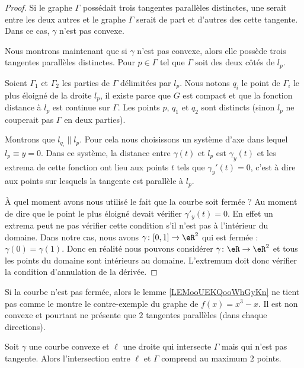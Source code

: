 \begin{proof}
    Si le graphe \( \Gamma\) possédait trois tangentes parallèles distinctes, une serait entre les deux autres et le graphe \( \Gamma\) serait de part et d'autres des cette tangente. Dans ce cas, \( \gamma\) n'est pas convexe.

    Nous montrons maintenant que si \( \gamma\) n'est pas convexe, alors elle possède trois tangentes parallèles distinctes. Pour \( p\in \Gamma\) tel que \( \Gamma\) soit des deux côtés de \( l_p\).

    Soient \( \Gamma_1\) et \( \Gamma_2\) les parties de \( \Gamma\) délimitées par \( l_p\). Nous notons \( q_i\) le point de \( \Gamma_i\) le plus éloigné de la droite \( l_p\), il existe parce que \( G\) est compact et que la fonction distance à \( l_p\) est continue sur \( \Gamma\). Les points \( p\), \( q_1\) et \( q_2\) sont distincts (sinon \( l_p\) ne couperait pas \( \Gamma\) en deux parties).

    Montrons que \( l_{q_i}\parallel l_p\). Pour cela nous choisissons un système d'axe dans lequel \( l_p\equiv y=0\). Dans ce système, la distance entre \( \gamma(t)\) et \( l_p\) est \( \gamma_y(t)\) et les extrema de cette fonction ont lieu aux points \( t\) tels que \( \gamma_y'(t)=0\), c'est à dire aux points sur lesquels la tangente est parallèle à \( l_p\).

    À quel moment avons nous utilisé le fait que la courbe soit fermée ? Au moment de dire que le point le plus éloigné devait vérifier \( \gamma'_y(t)=0\). En effet un extrema peut ne pas vérifier cette condition s'il n'est pas à l'intérieur du domaine. Dans notre cas, nous avons \( \gamma\colon \mathopen[ 0 , 1 \mathclose]\to \eR^2\) qui est fermée :  \( \gamma(0)=\gamma(1)\). Donc en réalité nous pouvons considérer \( \gamma\colon \eR\to \eR^2\) et tous les points du domaine sont intérieurs au domaine. L'extremum doit donc vérifier la condition d'annulation de la dérivée.
\end{proof}

\begin{example}
    Si la courbe n'est pas fermée, alors le lemme \ref{LEMooUEKQooWhGyKn} ne tient pas comme le montre le contre-exemple du graphe de \( f(x)=x^3-x\). Il est non convexe et pourtant ne présente que \( 2\) tangentes parallèles (dans chaque directions).
\end{example}

\begin{lemma}       \label{LEMooCSXCooIDPiKW}
    Soit \( \gamma\) une courbe convexe et \( \ell\) une droite qui intersecte \( \Gamma\) mais qui n'est pas tangente. Alors l'intersection entre \( \ell\) et \( \Gamma\) comprend au maximum \( 2\) points.
\end{lemma}

